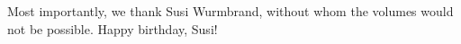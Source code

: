 \begin{refsection}
Most importantly, we thank Susi Wurmbrand, without whom the volumes would not be possible. Happy birthday, Susi!

\begin{comment}
Jonathan Bobaljik
Jon Sprouse
Zheng's students who did typesetting

Reviewers (by name?)

Lena Lohninger: for providing the email of Valentin Panzirsch
Elena Anagnostopoulou: for providing the email address of Athanasios
Yuta Sakamoto: for finding email addresses
\end{comment}

\printbibliography[heading=subbibliography]
\end{refsection}


